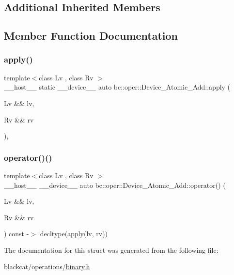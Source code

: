 \subsection*{Additional Inherited Members}


\subsection{Member Function Documentation}
\mbox{\label{structbc_1_1oper_1_1Device__Atomic__Add_a8b5d52f08c719fcc876fd6627a865f8d}} 
\subsubsection{\texorpdfstring{apply()}{apply()}}
{\footnotesize\ttfamily template$<$class Lv , class Rv $>$ \\
\+\_\+\+\_\+host\+\_\+\+\_\+ static \+\_\+\+\_\+device\+\_\+\+\_\+ auto bc\+::oper\+::\+Device\+\_\+\+Atomic\+\_\+\+Add\+::apply (\begin{DoxyParamCaption}\item[{Lv \&\&}]{lv,  }\item[{Rv \&\&}]{rv }\end{DoxyParamCaption})\hspace{0.3cm}{\ttfamily [inline]}, {\ttfamily [static]}}

\mbox{\label{structbc_1_1oper_1_1Device__Atomic__Add_a2013e78b39eb8092985d3462835ea7f9}} 
\subsubsection{\texorpdfstring{operator()()}{operator()()}}
{\footnotesize\ttfamily template$<$class Lv , class Rv $>$ \\
\+\_\+\+\_\+host\+\_\+\+\_\+ \+\_\+\+\_\+device\+\_\+\+\_\+ auto bc\+::oper\+::\+Device\+\_\+\+Atomic\+\_\+\+Add\+::operator() (\begin{DoxyParamCaption}\item[{Lv \&\&}]{lv,  }\item[{Rv \&\&}]{rv }\end{DoxyParamCaption}) const -\/$>$ decltype(\hyperlink{structbc_1_1oper_1_1Device__Atomic__Add_a8b5d52f08c719fcc876fd6627a865f8d}{apply}(lv, rv)) \hspace{0.3cm}{\ttfamily [inline]}}



The documentation for this struct was generated from the following file\+:\begin{DoxyCompactItemize}
\item 
blackcat/operations/\hyperlink{binary_8h}{binary.\+h}\end{DoxyCompactItemize}
